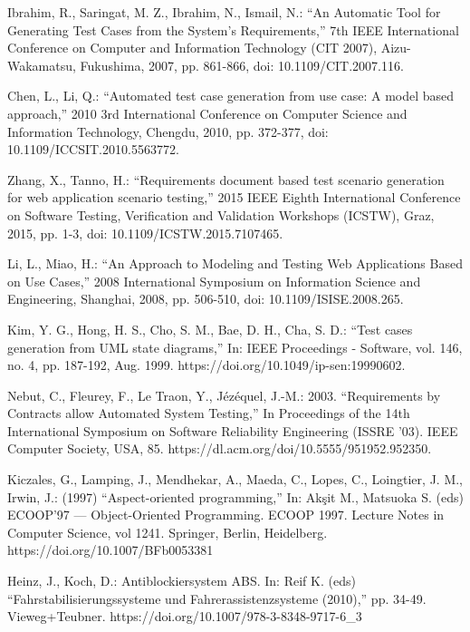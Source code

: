 \documentclass[a4paper,10pt, bibliography=totocnumbered]{scrreprt}
\begin{document}
\begin{thebibliography}{9}
 Ibrahim, R., Saringat, M. Z., Ibrahim, N., Ismail, N.: \enquote{An Automatic Tool for Generating Test Cases from the System's Requirements,} 7th IEEE International Conference on Computer and Information Technology (CIT 2007), Aizu-Wakamatsu, Fukushima, 2007, pp. 861-866, doi: 10.1109/CIT.2007.116.


 Chen, L., Li, Q.: \enquote{Automated test case generation from use case: A model based approach,} 2010 3rd International Conference on Computer Science and Information Technology, Chengdu, 2010, pp. 372-377, doi: 10.1109/ICCSIT.2010.5563772.

 Zhang, X., Tanno, H.: \enquote{Requirements document based test scenario generation for web application scenario testing,} 2015 IEEE Eighth International Conference on Software Testing, Verification and Validation Workshops (ICSTW), Graz, 2015, pp. 1-3, doi: 10.1109/ICSTW.2015.7107465.

 Li, L., Miao, H.: \enquote{An Approach to Modeling and Testing Web Applications Based on Use Cases,} 2008 International Symposium on Information Science and Engineering, Shanghai, 2008, pp. 506-510, doi: 10.1109/ISISE.2008.265.

 Kim, Y. G., Hong, H. S., Cho, S. M., Bae, D. H., Cha, S. D.: \enquote{Test cases generation from UML state diagrams,}
In: IEEE Proceedings - Software, vol. 146, no. 4, pp. 187-192, Aug. 1999.
https://doi.org/10.1049/ip-sen:19990602.

 Nebut, C., Fleurey, F., Le Traon, Y., Jézéquel, J.-M.: 2003. \enquote{Requirements by Contracts allow Automated System Testing,} In Proceedings of the 14th International Symposium on Software Reliability Engineering (ISSRE '03). IEEE Computer Society, USA, 85.
https://dl.acm.org/doi/10.5555/951952.952350.


 Kiczales, G., Lamping, J., Mendhekar, A., Maeda, C., Lopes, C., Loingtier, J. M., Irwin, J.: (1997) \enquote{Aspect-oriented programming,} In: Akşit M., Matsuoka S. (eds) ECOOP'97 — Object-Oriented Programming. ECOOP 1997. Lecture Notes in Computer Science, vol 1241. Springer, Berlin, Heidelberg.
https://doi.org/10.1007/BFb0053381

 Heinz, J., Koch, D.: Antiblockiersystem ABS.
In: Reif K. (eds) \enquote{Fahrstabilisierungssysteme und Fahrerassistenzsysteme (2010),} pp. 34-49. Vieweg+Teubner. 
https://doi.org/10.1007/978-3-8348-9717-6\_3


\end{thebibliography}
\end{document}
